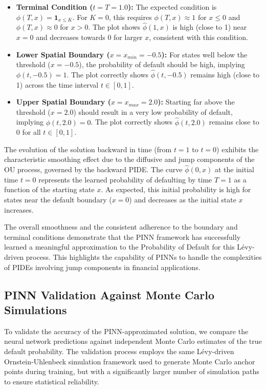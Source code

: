 \documentclass[11pt,twoside,openright]{report}
\begin{document}
\begin{itemize}
    \item \textbf{Terminal Condition ($t=T=1.0$):} The expected condition is $\phi(T, x) = \mathbf{1}_{x \le K}$. For $K=0$, this requires $\phi(T, x) \approx 1$ for $x \le 0$ and $\phi(T, x) \approx 0$ for $x > 0$. The plot shows $\hat{\phi}(1, x)$ is high (close to 1) near $x=0$ and decreases towards 0 for larger $x$, consistent with this condition.
    \item \textbf{Lower Spatial Boundary ($x=x_{min}=-0.5$):} For states well below the threshold ($x=-0.5$), the probability of default should be high, implying $\phi(t, -0.5) = 1$. The plot correctly shows $\hat{\phi}(t, -0.5)$ remains high (close to 1) across the time interval $t \in [0, 1]$.
    \item \textbf{Upper Spatial Boundary ($x=x_{max}=2.0$):} Starting far above the threshold ($x=2.0$) should result in a very low probability of default, implying $\phi(t, 2.0) = 0$. The plot correctly shows $\hat{\phi}(t, 2.0)$ remains close to 0 for all $t \in [0, 1]$.
\end{itemize}
 
The evolution of the solution backward in time (from $t=1$ to $t=0$) exhibits the characteristic smoothing effect due to the diffusive and jump components of the OU process, governed by the backward PIDE. The curve $\hat{\phi}(0, x)$ at the initial time $t=0$ represents the learned probability of defaulting by time $T=1$ as a function of the starting state $x$. As expected, this initial probability is high for states near the default boundary ($x=0$) and decreases as the initial state $x$ increases.
 
The overall smoothness and the consistent adherence to the boundary and terminal conditions demonstrate that the PINN framework has successfully learned a meaningful approximation to the Probability of Default for this Lévy-driven process. This highlights the capability of PINNs to handle the complexities of PIDEs involving jump components in financial applications.

\subsection{PINN Validation Against Monte Carlo Simulations}
\label{sec:pinn_validation}

To validate the accuracy of the PINN-approximated solution, we compare the neural network predictions against independent Monte Carlo estimates of the true default probability. The validation process employs the same Lévy-driven Ornstein-Uhlenbeck simulation framework used to generate Monte Carlo anchor points during training, but with a significantly larger number of simulation paths to ensure statistical reliability.
\end{document}
